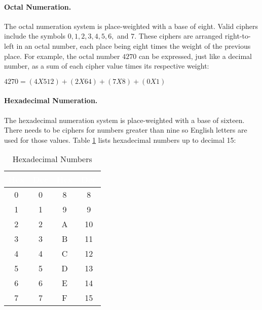 \paragraph{Octal Numeration.} The octal numeration system is place-weighted with a base of eight. Valid ciphers include the symbols $ 0, 1, 2, 3, 4, 5, 6, $ and $ 7 $. These ciphers are arranged right-to-left in an octal number, each place being eight times the weight of the previous place. For example, the octal number $ 4270 $ can be expressed, just like a decimal number, as a sum of each cipher value times its respective weight:

\begin{center}
  $4270 = (4 X 512) + (2 X 64) + (7 X 8) + (0 X 1)$
\end{center}

\paragraph{Hexadecimal Numeration.} The hexadecimal numeration system is place-weighted with a base of sixteen. There needs to be ciphers for numbers greater than nine so English letters are used for those values. Table \ref{MF:tab:hexadecimal_numbers} lists hexadecimal numbers up to decimal 15:

\begin{table}[H]
  \sffamily
  \newcommand{\head}[1]{\textcolor{white}{\textbf{#1}}}  
  \begin{center}
    \begin{tabular}{|cc|cc|} 
      \hline
      \rowcolor{black!75}
      \head{Hex} & \head{Dec} & \head{Hex} & \head{Dec} \\ 
      \hline
      0 & 0 & 8 & 8  \\ 
      1 & 1 & 9 & 9  \\ 
      2 & 2 & A & 10 \\ 
      3 & 3 & B & 11 \\ 
      4 & 4 & C & 12 \\ 
      5 & 5 & D & 13 \\ 
      6 & 6 & E & 14 \\ 
      7 & 7 & F & 15 \\ 
      \hline
    \end{tabular} 
  \end{center}
  \caption{Hexadecimal Numbers}
  \label{MF:tab:hexadecimal_numbers}  
\end{table}

